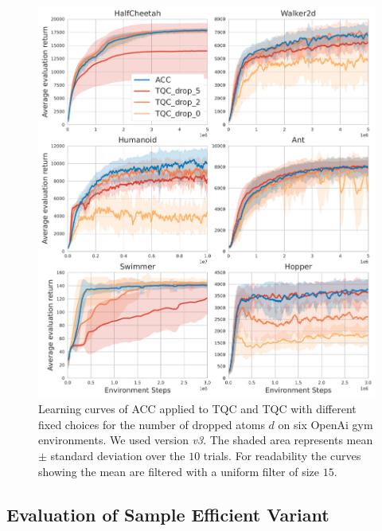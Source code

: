 \begin{figure}
    \centering
    \includegraphics[width=0.93\linewidth]{images/ablation/ablation_const_drop_results_one_fig.pdf}
    \caption{Learning curves of ACC applied to TQC and TQC with different fixed choices for the number of dropped atoms $d$ on six OpenAi gym environments. We used version \textit{v3}. The shaded area represents  mean $\pm$ standard deviation over the $10$ trials. For readability the curves showing the mean are filtered  with a uniform filter of size $15$.}
    \label{fig:ablation_const_number_dropped_atoms_single_curves}
\vspace{-0.5cm}
\end{figure}



\subsection{Evaluation of Sample Efficient Variant}






